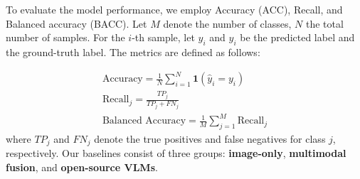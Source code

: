 \documentclass[preprint,12pt]{elsarticle}
\begin{document}
To evaluate the model performance, we employ Accuracy (ACC), Recall, and Balanced accuracy (BACC). Let $M$ denote the number of classes, $N$ the total number of samples. For the $i$-th sample, let $\hat{y}_i$ and $y_i$ be the predicted label and the ground-truth label. The metrics are defined as follows:


\begin{equation}
	\begin{gathered}
		\text{Accuracy} = \frac{1}{N} \sum_{i=1}^{N} \mathbf{1}(\hat{y}_i = y_i) \\
		\text{Recall}_j = \frac{TP_j}{TP_j + FN_j} \\
		\text{Balanced Accuracy} = \frac{1}{M} \sum_{j=1}^{M} \text{Recall}_j
	\end{gathered}
\end{equation}
where $TP_j$ and $FN_j$ denote the true positives and false negatives for class $j$, respectively. Our baselines consist of three groups: \textbf{image-only}\cite{simonyan2014very,he2016deep,tan2019efficientnet,sandler2018mobilenetv2,huang2017densely}, \textbf{multimodal fusion}\cite{pacheco2020impact,khurshid2025multimodal,li2020fusing,pacheco2021attention,khurshid2024optimizing}, and \textbf{open-source VLMs}\cite{yan2025multimodal}.
\end{document}
